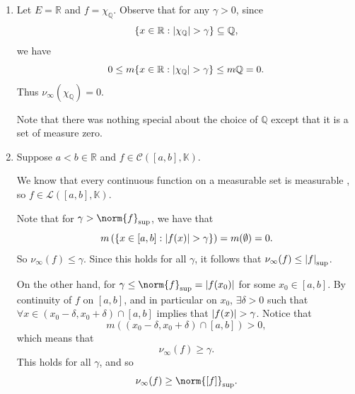 \documentclass[notoc,notitlepage]{tufte-book}
\begin{document}
\begin{eg}
  \begin{enumerate}
    \item Let $E = \mathbb{R}$ and $f = \chi_{\mathbb{Q}}$. Observe that for any
      $\gamma > 0$, since
      \begin{equation*}
        \{ x \in \mathbb{R} : \left| \chi_{\mathbb{Q}} \right| > \gamma \} \subseteq
        \mathbb{Q},
      \end{equation*}
      we have
      \begin{equation*}
        0 \leq m \{ x \in \mathbb{R} : \left| \chi_{\mathbb{Q}} \right| > \gamma \}
        \leq m \mathbb{Q} = 0.
      \end{equation*}
      Thus $\nu_\infty(\chi_\mathbb{Q}) = 0$.

      Note that there was nothing special about the choice of $\mathbb{Q}$ 
      except that it is a set of measure zero.

    \item Suppose $a < b \in \mathbb{R}$ and $f \in \mathcal{C}([a, b] ,
      \mathbb{K})$.

       We know that every continuous function on a measurable set is
    measurable , so $f
    \in \mathcal{L}([a, b], \mathbb{K})$.

    Note that for $\gamma > \norm{f}_{\sup}$, we have that
    \begin{equation*}
      m \left( \left\{ x \in [a, b] : \left|f(x)\right| > \gamma \right\} \right) =
      m(\emptyset) = 0.
    \end{equation*}
    So $\nu_\infty(f) \leq \gamma$. Since this holds for all $\gamma$, it
    follows that $\nu_\infty(f) \leq \left|f\right|_{\sup}$.

    On the other hand, for $\gamma \leq \norm{f}_{\sup} = \abs{f(x_0)}$ for some
    $x_0 \in [a, b]$. By continuity of $f$ on $[a, b]$, and in particular on
    $x_0$, $\exists \delta > 0$ such that $\forall x \in (x_0 - \delta, x_0 +
    \delta) \cap [a, b]$ implies that $\left|f(x)\right| > \gamma$. Notice that
    \begin{equation*}
      m \left( (x_0 - \delta, x_0 + \delta) \cap [a, b] \right) > 0,
    \end{equation*}
    which means that
    \begin{equation*}
      \nu_\infty(f) \geq \gamma.
    \end{equation*}
    This holds for all $\gamma$, and so
    \begin{equation*}
      \nu_\infty(f) \geq \norm{[f]}_{\sup}.
    \end{equation*}


\end{enumerate}
\end{eg}
\end{document}
